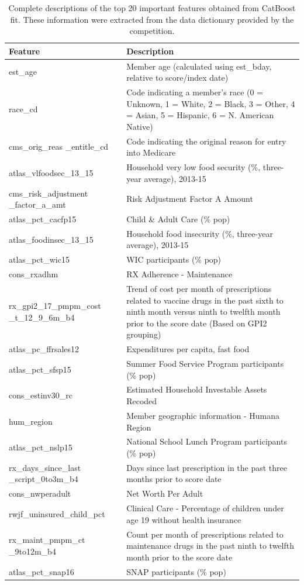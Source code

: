 \documentclass[
  12pt,
]{article}
\begin{document}
\begin{table}[H]

\caption{\label{tab:unnamed-chunk-9}Complete descriptions of the top 20 important features obtained from CatBoost fit. These information were extracted from the data dictionary provided by the competition.}
\centering
\begin{tabular}[t]{>{\raggedright\arraybackslash}p{2in}>{\raggedright\arraybackslash}p{3.6in}}
\toprule
Feature & Description\\
\midrule
est\_age & Member age (calculated using est\_bday, relative to score/index date)\\
race\_cd & Code indicating a member's race (0 = Unknown, 1 = White, 2 = Black, 3 = Other, 4 = Asian, 5 = Hispanic, 6 = N. American Native)\\
cms\_orig\_reas \_entitle\_cd & Code indicating the original reason for entry into Medicare\\
atlas\_vlfoodsec\_13\_15 & Household very low food security (\%, three-year average), 2013-15\\
cms\_risk\_adjustment \_factor\_a\_amt & Risk Adjustment Factor A Amount\\
\addlinespace
atlas\_pct\_cacfp15 & Child \& Adult Care (\% pop)\\
atlas\_foodinsec\_13\_15 & Household food insecurity (\%, three-year average), 2013-15\\
atlas\_pct\_wic15 & WIC participants (\% pop)\\
cons\_rxadhm & RX Adherence - Maintenance\\
rx\_gpi2\_17\_pmpm\_cost \_t\_12\_9\_6m\_b4 & Trend of cost per month of prescriptions related to vaccine drugs in the past sixth to ninth month versus ninth to twelfth month prior to the score date (Based on GPI2 grouping)\\
\addlinespace
atlas\_pc\_ffrsales12 & Expenditures per capita, fast food\\
atlas\_pct\_sfsp15 & Summer Food Service Program participants (\% pop)\\
cons\_estinv30\_rc & Estimated Household Investable Assets Recoded\\
hum\_region & Member geographic information - Humana Region\\
atlas\_pct\_nslp15 & National School Lunch Program participants (\% pop)\\
\addlinespace
rx\_days\_since\_last \_script\_0to3m\_b4 & Days since last prescription in the past three
months prior to score date\\
cons\_nwperadult & Net Worth Per Adult\\
rwjf\_uninsured\_child\_pct & Clinical Care - Percentage of children under age 19
without health insurance\\
rx\_maint\_pmpm\_ct \_9to12m\_b4 & Count per month of prescriptions related to
maintenance drugs in the past ninth to twelfth
month prior to the score date\\
atlas\_pct\_snap16 & SNAP participants (\% pop)\\
\bottomrule
\end{tabular}
\end{table}
\end{document}
